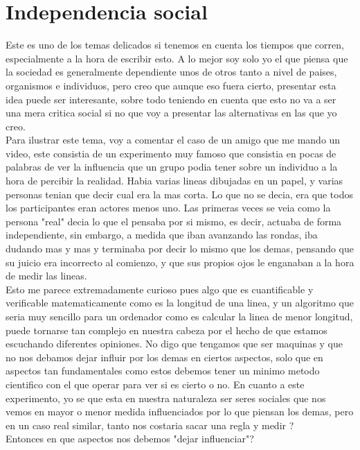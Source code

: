 \section{Independencia social}
Este es uno de los temas delicados si tenemos en cuenta los tiempos que corren, especialmente a la hora de escribir esto. A lo mejor soy solo yo el que piensa que la sociedad es generalmente dependiente unos de otros tanto a nivel de paises, organismos e individuos, pero creo que aunque eso fuera cierto, presentar esta idea puede ser interesante, sobre todo teniendo en cuenta que esto no va a ser una mera critica social si no que voy a presentar las alternativas en las que yo creo.\\

Para ilustrar este tema, voy a comentar el caso de un amigo que me mando un video, este consistia de un experimento muy famoso \cite{asch1951effects} que consistia en pocas de palabras de ver la influencia que un grupo podia tener sobre un individuo a la hora de percibir la realidad. Habia varias lineas dibujadas en un papel, y varias personas tenian que decir cual era la mas corta. Lo que no se decia, era que todos los participantes eran actores menos uno. Las primeras veces se veia como la persona "real" decia lo que el pensaba por si mismo, es decir, actuaba de forma independiente, sin embargo, a medida que iban avanzando las rondas, iba dudando mas y mas y terminaba por decir lo mismo que los demas, pensando que su juicio era incorrecto al comienzo, y que sus propios ojos le enganaban a la hora de medir las lineas.\\


Esto me parece extremadamente curioso pues algo que es cuantificable y verificable matematicamente como es la longitud de una linea, y un algoritmo que seria muy sencillo para un ordenador como es calcular la linea de menor longitud, puede tornarse tan complejo en nuestra cabeza por el hecho de que estamos escuchando diferentes opiniones. No digo que tengamos que ser maquinas y que no nos debamos dejar influir por los demas en ciertos aspectos, solo que en aspectos tan fundamentales como estos debemos tener un minimo metodo cientifico con el que operar para ver si es cierto o no. En cuanto a este experimento, yo se que esta en nuestra naturaleza ser seres sociales que nos vemos en mayor o menor medida influenciados por lo que piensan los demas, pero en un caso real similar, tanto nos costaria sacar una regla y medir ? \\

Entonces en que aspectos nos debemos "dejar influenciar"? \\

